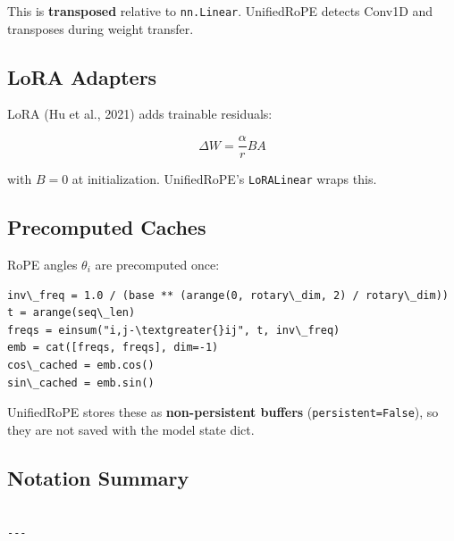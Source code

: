 This is \textbf{transposed} relative to \texttt{nn.Linear}. UnifiedRoPE detects Conv1D 
and transposes during weight transfer.

\subsection{LoRA Adapters}

LoRA (Hu et al., 2021) adds trainable residuals:

\[
\Delta W = \frac{\alpha}{r} B A
\tag{3.8}
\]

with $B = 0$ at initialization. UnifiedRoPE's \texttt{LoRALinear} wraps this.

\subsection{Precomputed Caches}

RoPE angles $\theta_i$ are precomputed once:

\begin{lstlisting}
inv\_freq = 1.0 / (base ** (arange(0, rotary\_dim, 2) / rotary\_dim))
t = arange(seq\_len)
freqs = einsum("i,j-\textgreater{}ij", t, inv\_freq)
emb = cat([freqs, freqs], dim=-1)
cos\_cached = emb.cos()
sin\_cached = emb.sin()
\end{lstlisting}

UnifiedRoPE stores these as \textbf{non-persistent buffers} (\texttt{persistent=False}), 
so they are not saved with the model state dict.

\subsection{Notation Summary}

\begin{lstlisting}

---
\end{lstlisting}